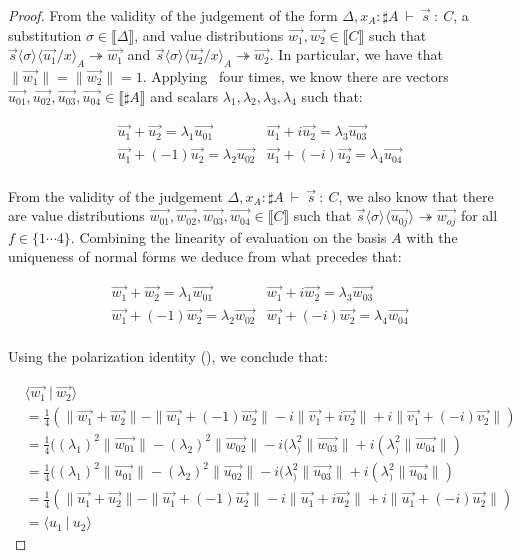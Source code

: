 \documentclass[runningheads,orivec]{llncs}
\newcommand\ansubst[2]{\ensuremath{\langle #1 \rangle_{#2}}}
\def\scal#1#2{\langle{#1}~|~{#2}\rangle}
\def\eval{\twoheadrightarrow}
\def\sem#1{\llbracket#1\rrbracket}
\def\TYP#1#2#3{#1~{\vdash}~#2~{:}~#3}
\begin{document}
\begin{proof}
    From the validity of the judgement of the form $\TYP{\Delta, x_A:\sharp A}{\vec{s}}{C}$, a substitution $\sigma\in\sem{\Delta}$, and value distributions $\vec{w_1},\vec{w_2}\in\sem{C}$ such that $\vec{s}\ansubst{\sigma}{}\ansubst{\vec{u_1}/x}{A}\eval\vec{w_1}$ and $\vec{s}\ansubst{\sigma}{}\ansubst{\vec{u_2}/x}{A}\eval\vec{w_2}$. In particular, we have that $\|\vec{w_1}\| = \|\vec{w_2}\|=1$. Applying ~four times, we know there are vectors $\vec{u_{01}},\vec{u_{02}},\vec{u_{03}},\vec{u_{04}}\in\sem{\sharp A}$ and scalars $\lambda_1,\lambda_2,\lambda_3,\lambda_4$ such that:
    
    \begin{align*}
        \vec{u_1} + \vec{u_2} = \lambda_1 \vec{u_{01}} & \vec{u_1} + i \vec{u_2} = \lambda_3 \vec{u_{03}} \\
        \vec{u_1} + (-1) \vec{u_2} = \lambda_2 \vec{u_{02}} & \vec{u_1} + (-i) \vec{u_2} = \lambda_4 \vec{u_{04}} \\
    \end{align*}

    From the validity of the judgement  $\TYP{\Delta, x_A:\sharp A}{\vec{s}}{C}$, we also know that there are value distributions $\vec{w_{01}},\vec{w_{02}},\vec{w_{03}},\vec{w_{04}}\in\sem{C}$ such that $\vec{s}\ansubst{\sigma}{}\ansubst{\vec{u_{0j}}}{}\eval\vec{w_{oj}}$ for all $f\in\{1\dotsb 4\}$. Combining the linearity of evaluation on the basis $A$ with the uniqueness of normal forms we deduce from what precedes that:

    \begin{align*}
        \vec{w_1} + \vec{w_2} = \lambda_1 \vec{w_{01}} & \vec{w_1} + i \vec{w_2} = \lambda_3 \vec{w_{03}} \\
        \vec{w_1} + (-1) \vec{w_2} = \lambda_2 \vec{w_{02}} & \vec{w_1} + (-i) \vec{w_2} = \lambda_4 \vec{w_{04}} \\
    \end{align*}

    Using the polarization identity (), we conclude that:

    \begin{align*}
        &\scal{\vec{w_1}}{\vec{w_2}}\\
        &= \frac{1}{4}(\|\vec{w_1}+\vec{w_2}\| - \|\vec{w_1} + (-1)\vec{w_2}\| - i \|\vec{v_1} + i \vec{v_2}\| + i \|\vec{v_1} + (-i) \vec{v_2}\|)\\
        &= \frac{1}{4}((\lambda_1)^2\|\vec{w_{01}}\| - (\lambda_2)^2\|\vec{w_{02}}\| - i (\lambda_)^2 \|\vec{w_{03}}\| + i (\lambda_)^2\|\vec{w_{04}}\|)\\
        &= \frac{1}{4}((\lambda_1)^2\|\vec{u_{01}}\| - (\lambda_2)^2\|\vec{u_{02}}\| - i (\lambda_)^2 \|\vec{u_{03}}\| + i (\lambda_)^2\|\vec{u_{04}}\|)\\
        &= \frac{1}{4}(\|\vec{u_1}+\vec{u_2}\| - \|\vec{u_1} + (-1)\vec{u_2}\| - i \|\vec{u_1} + i \vec{u_2}\| + i \|\vec{u_1} + (-i) \vec{u_2}\|)\\
        &=\scal{u_1}{u_2}
    \end{align*}

\end{proof}
\end{document}
